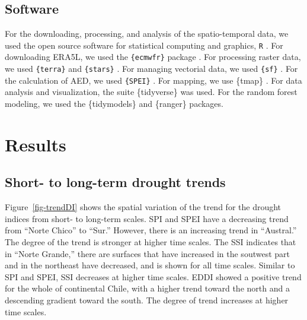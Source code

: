 \documentclass[
  authoryear,
  preprint,
  3p,
  onecolumn]{elsarticle}
\begin{document}
\hypertarget{software}{%
\subsection{Software}\label{software}}

For the downloading, processing, and analysis of the spatio-temporal
data, we used the open source software for statistical computing and
graphics, \texttt{R} \citep{R2023}. For downloading ERA5L, we used the
\texttt{\{ecmwfr\}} package \citep{Hufkens2019}. For processing raster
data, we used \texttt{\{terra\}} \citep{Hijmans2023} and
\texttt{\{stars\}} \citep{Pebesma2023}. For managing vectorial data, we
used \texttt{\{sf\}} \citep{Pebesma2018}. For the calculation of AED, we
used \texttt{\{SPEI\}} \citep{Bergueria2023}. For mapping, we use
\{tmap\} \citep{Tennekes2018}. For data analysis and visualization, the
suite \{tidyverse\} \citep{Wickham2019} was used. For the random forest
modeling, we used the \{tidymodels\}\citep{Kuhn2020} and
\{ranger\}\citep{Wright2017} packages.

\hypertarget{results}{%
\section{Results}\label{results}}

\hypertarget{short--to-long-term-drought-trends-1}{%
\subsection{Short- to long-term drought
trends}\label{short--to-long-term-drought-trends-1}}

Figure~\ref{fig-trendDI} shows the spatial variation of the trend for
the drought indices from short- to long-term scales. SPI and SPEI have a
decreasing trend from ``Norte Chico'' to ``Sur.'' However, there is an
increasing trend in ``Austral.'' The degree of the trend is stronger at
higher time scales. The SSI indicates that in ``Norte Grande,'' there
are surfaces that have increased in the soutwest part and in the
northeast have decreased, and is shown for all time scales. Similar to
SPI and SPEI, SSI decreases at higher time scales. EDDI showed a
positive trend for the whole of continental Chile, with a higher trend
toward the north and a descending gradient toward the south. The degree
of trend increases at higher time scales.

\blandscape
\end{document}
